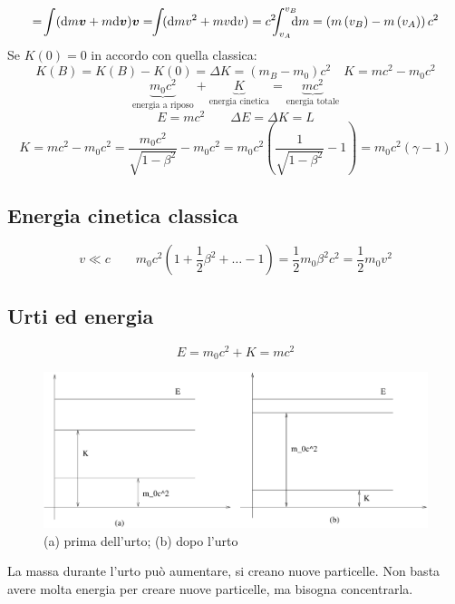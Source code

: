 \begin{equation*}=\!\int(\ud m\ve v+m\ud\ve v)\ve v=\!\!\int\!(\ud mv^2+mv\ud v)=c^2\!\!\!\int_{v_A}^{v_B}\!\!\!\!\ud m=\left(m\left(v_B\right)-m\left(v_A\right)\right)c^2\end{equation*}
Se $K(0)=0$ in accordo con quella classica:
\begin{equation*}K(B)=K(B)-K(0)=\Delta K=(m_B-m_0)c^2\quad K=mc^2-m_0c^2\end{equation*}
\begin{equation*}\underbrace{m_0c^2}_{\text{energia a riposo}}+\underbrace{K}_{\text{energia cinetica}}=\underbrace{mc^2}_{\text{energia totale}}\end{equation*}
\begin{equation*}E=mc^2\qquad \Delta E=\Delta K=L\end{equation*}
\begin{equation*}K=mc^2-m_0c^2=\frac{m_0c^2}{\sqrt{1-\beta^2}}-m_0c^2=m_0c^2\left(\frac{1}{\sqrt{1-\beta^2}}-1\right)=m_0c^2\left(\gamma-1\right)\end{equation*}
\subsection{Energia cinetica classica}
\begin{equation*}v\ll c\qquad m_0c^2\left(1+\frac{1}{2}\beta^2+\ldots-1\right)=\frac{1}{2}m_0\beta^2c^2=\frac{1}{2}m_0v^2\end{equation*}
\subsection{Urti ed energia}
\begin{equation*}E=m_0c^2+K=mc^2\end{equation*}
\begin{figure}[htbp]
   \centering
   \includegraphics[scale=0.5]{immagini/fisica1/urto_rel}
   \caption{(a) prima dell'urto; (b) dopo l'urto}
\end{figure}
La massa durante l'urto può aumentare, si creano nuove particelle. Non basta avere molta energia per creare nuove particelle, ma bisogna concentrarla.

